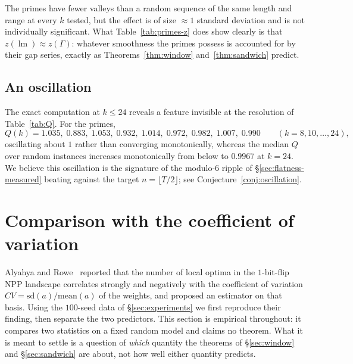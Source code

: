 \documentclass[11pt,a4paper]{article}
\theoremstyle{plain}
\theoremstyle{definition}
\theoremstyle{remark}
\DeclareMathOperator{\lm}{lm}
\begin{document}
The primes have fewer valleys than a random sequence of the same length and
range at every $k$ tested, but the effect is of size $\approx1$ standard
deviation and is not individually significant. What Table~\ref{tab:primes-z}
does show clearly is that $z(\lm)\approx z(\Gamma)$: whatever smoothness the
primes possess is accounted for by their gap series, exactly as
Theorems~\ref{thm:window} and~\ref{thm:sandwich} predict.

\subsection{An oscillation}\label{sec:oscillation}

The exact computation at $k\le24$ reveals a feature invisible at the resolution
of Table~\ref{tab:Q}. For the primes,
\[
  Q(k)=1.035,\;0.883,\;1.053,\;0.932,\;1.014,\;0.972,\;0.982,\;1.007,\;0.990
  \qquad(k=8,10,\dots,24),
\]
oscillating about $1$ rather than converging monotonically, whereas the median
$Q$ over random instances increases monotonically from below to $0.9967$ at
$k=24$. We believe this oscillation is the signature of the modulo-$6$ ripple of
\S\ref{sec:flatness-measured} beating against the target
$n=\lfloor T/2\rfloor$; see Conjecture~\ref{conj:oscillation}.

\section{Comparison with the coefficient of variation}\label{sec:cv}

Alyahya and Rowe~\cite{AR14} reported that the number of local optima in the
$1$-bit-flip NPP landscape correlates strongly and negatively with the
coefficient of variation $CV=\mathrm{sd}(a)/\mathrm{mean}(a)$ of the weights,
and proposed an estimator on that basis. Using the $100$-seed data of
\S\ref{sec:experiments} we first reproduce their finding, then separate the two
predictors. This section is empirical throughout: it compares two statistics on
a fixed random model and claims no theorem. What it is meant to settle is a
question of \emph{which} quantity the theorems of \S\ref{sec:window} and
\S\ref{sec:sandwich} are about, not how well either quantity predicts.
\end{document}
